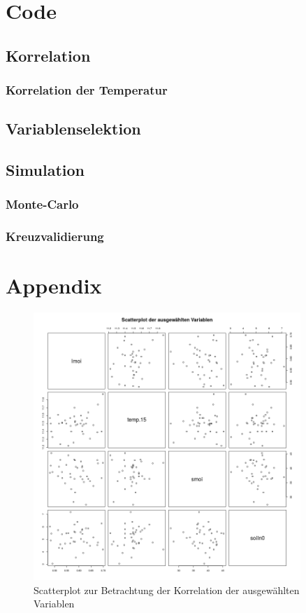 \section{Code}

\subsection{Korrelation}


\subsubsection{Korrelation der Temperatur}


\subsection{Variablenselektion}


\subsection{Simulation}
\subsubsection{Monte-Carlo}

\subsubsection{Kreuzvalidierung}


\newpage
\FloatBarrier
\section{Appendix}

\begin{figure}[h!]
	\centering
	\includegraphics[width=0.9\textwidth]{fig/model/scatterplot-pearson-normalverteilt.png}
	\caption{Scatterplot zur Betrachtung der Korrelation der ausgewählten Variablen}
	\label{fig:scatter-top4}
\end{figure}

